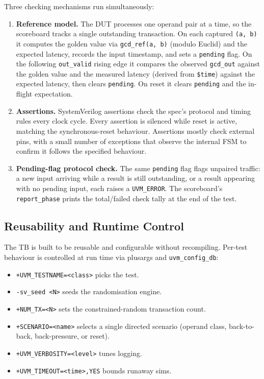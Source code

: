 \documentclass[11pt,a4paper]{article}
\begin{document}
Three checking mechanisms run simultaneously:

\begin{enumerate}
    \item \textbf{Reference model.} The DUT processes one operand pair at a time, so the scoreboard tracks a single outstanding transaction. On each captured \texttt{(a, b)} it computes the golden value via \texttt{gcd\_ref(a, b)} (modulo Euclid) and the expected latency, records the input timestamp, and sets a \texttt{pending} flag. On the following \texttt{out\_valid} rising edge it compares the observed \texttt{gcd\_out} against the golden value and the measured latency (derived from \texttt{\$time}) against the expected latency, then clears \texttt{pending}. On reset it clears \texttt{pending} and the in-flight expectation.

    \item \textbf{Assertions.} SystemVerilog assertions check the spec's protocol and timing rules every clock cycle. Every assertion is silenced while reset is active, matching the synchronous-reset behaviour. Assertions mostly check external pins, with a small number of exceptions that observe the internal FSM to confirm it follows the specified behaviour.

    \item \textbf{Pending-flag protocol check.} The same \texttt{pending} flag flags unpaired traffic: a new input arriving while a result is still outstanding, or a result appearing with no pending input, each raises a \texttt{UVM\_ERROR}. The scoreboard's \texttt{report\_phase} prints the total/failed check tally at the end of the test.
\end{enumerate}

\subsection{Reusability and Runtime Control}

The TB is built to be reusable and configurable without recompiling. Per-test behaviour is controlled at run time via plusargs and \texttt{uvm\_config\_db}:

\begin{itemize}
    \item \texttt{+UVM\_TESTNAME=<class>} picks the test.
    \item \texttt{-sv\_seed <N>} seeds the randomisation engine.
    \item \texttt{+NUM\_TX=<N>} sets the constrained-random transaction count.
    \item \texttt{+SCENARIO=<name>} selects a single directed scenario (operand class, back-to-back, back-pressure, or reset).
    \item \texttt{+UVM\_VERBOSITY=<level>} tunes logging.
    \item \texttt{+UVM\_TIMEOUT=<time>,YES} bounds runaway sims.
\end{itemize}
\end{document}
